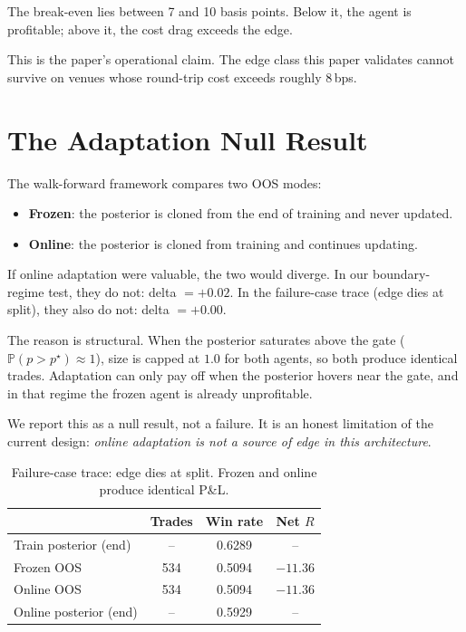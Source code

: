 \documentclass[11pt,a4paper]{article}
\newcommand{\gld}[1]{\textcolor{goldshiny}{#1}}
\newcommand{\cel}[1]{\textcolor{celadon}{#1}}
\theoremstyle{definition}
\begin{document}
The break-even lies between 7 and 10 basis points. Below it, the agent is profitable; above it, the cost drag exceeds the edge.

This is the paper's operational claim. The edge class this paper validates cannot survive on venues whose round-trip cost exceeds roughly \gld{8\,bps}.

\section{The Adaptation Null Result}
\label{sec:null}

The walk-forward framework compares two OOS modes:

\begin{itemize}[leftmargin=2em]
  \item \gld{\textbf{Frozen}}: the posterior is cloned from the end of training and never updated.
  \item \cel{\textbf{Online}}: the posterior is cloned from training and continues updating.
\end{itemize}

If online adaptation were valuable, the two would diverge. In our boundary-regime test, they do not: delta $= +0.02$. In the failure-case trace (edge dies at split), they also do not: delta $= +0.00$.

The reason is structural. When the posterior saturates above the gate ($\mathbb{P}(p > p^\star) \approx 1$), size is capped at $1.0$ for both agents, so both produce identical trades. Adaptation can only pay off when the posterior hovers near the gate, and in that regime the frozen agent is already unprofitable.

We report this as a \cel{null result}, not a failure. It is an honest limitation of the current design: \emph{online adaptation is not a source of edge in this architecture}.

\begin{table}[ht]
\centering
\caption{Failure-case trace: edge dies at split. Frozen and online produce identical P\&L.}
\label{tab:null}
\renewcommand{\arraystretch}{1.15}
\begin{tabular}{lccc}
\toprule
\gld{ } & \gld{Trades} & \gld{Win rate} & \gld{Net $R$} \\
\midrule
Train posterior (end)   & -- & 0.6289 & -- \\
Frozen OOS              & 534 & 0.5094 & $-11.36$ \\
Online OOS              & 534 & 0.5094 & $-11.36$ \\
Online posterior (end)  & -- & 0.5929 & -- \\
\bottomrule
\end{tabular}
\end{table}
\end{document}
